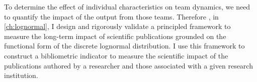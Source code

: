 To determine the effect of individual characteristics on team dynamics, we need to quantify the impact of the output from those teams. Therefore , in \autoref{ch:lognormal}, I design and rigorously validate a principled framework to measure the long-term impact of scientific publications grounded on the functional form of the discrete lognormal distribution. I use this framework to construct a bibliometric indicator to measure the scientific impact of the publications authored by a researcher and those associated with a given research institution.
